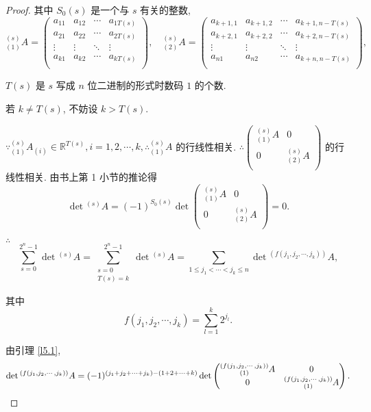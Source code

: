 \documentclass[color=black,device=normal,lang=cn,mode=geye]{elegantnote}
\begin{document}
\begin{landscape}
\begin{proof}
    其中 $S_0(s)$ 是一个与 $s$ 有关的整数,
    \[{}_{(1)}^{(s)}A=\begin{pmatrix}
        a_{11} & a_{12} & \cdots & a_{1T(s)} \\
        a_{21} & a_{22} & \cdots & a_{2T(s)} \\
        \vdots & \vdots & \ddots & \vdots \\
        a_{k1} & a_{k2} & \cdots & a_{kT(s)} \\
    \end{pmatrix},\quad{}_{(2)}^{(s)}A=\begin{pmatrix}
        a_{k+1,1} & a_{k+1,2} & \cdots & a_{k+1,n-T(s)} \\
        a_{k+2,1} & a_{k+2,2} & \cdots & a_{k+2,n-T(s)} \\
        \vdots & \vdots & \ddots & \vdots \\
        a_{n1} & a_{n2} & \cdots & a_{k+n,n-T(s)} \\
    \end{pmatrix},\]

    $T(s)$ 是 $s$ 写成 $n$ 位二进制的形式时数码 $1$ 的个数.

    若 $k\neq T(s)$, 不妨设 $k>T(s)$.

    $\because{}_{(1)}^{(s)}A_{(i)}\in\mathbb{R}^{T(s)},i=1,2,\cdots,k,\therefore{}_{(1)}^{(s)}A$ 的行线性相关. $\therefore\begin{pmatrix} {}_{(1)}^{(s)}A & 0 \\ 0 & {}_{(2)}^{(s)}A \\ \end{pmatrix}$ 的行线性相关. 由书上第 1 小节的推论得
    \[\det{}^{(s)}A=(-1)^{S_0(s)}\det\begin{pmatrix}
        {}_{(1)}^{(s)}A & 0 \\
        0 & {}_{(2)}^{(s)}A \\
    \end{pmatrix}=0.\]

    $\therefore$
    \[\sum\limits_{s=0}^{2^n-1}\det{}^{(s)}A=\sum\limits_{\substack{s=0\\T(s)=k}}^{2^n-1}\det{}^{(s)}A=\sum\limits_{1\leq j_1<\cdots<j_k\leq n}\det{}^{(f(j_1,j_2,\cdots,j_k))}A,\]

    其中
    \[f(j_1,j_2,\cdots,j_k)=\sum\limits_{l=1}^k2^{j_l}.\]

    由引理 \ref{l5.1},
    \[\det{}^{(f(j_1,j_2,\cdots,j_k))}A=(-1)^{(j_1+j_2+\cdots+j_k)-(1+2+\cdots+k)}\det\begin{pmatrix}
        \begin{subarray}{c}
            (f(j_1,j_2,\cdots,j_k)) \\
            (1)
        \end{subarray}A & 0 \\
        0 & \begin{subarray}{c}
                (f(j_1,j_2,\cdots,j_k)) \\
                (1)
            \end{subarray}A \\
    \end{pmatrix}.\]


\end{proof}
\end{landscape}
\end{document}
